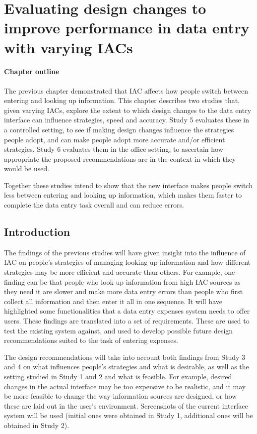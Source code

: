 \documentclass[11pt,oneside]{report}
\begin{document}
\begin{table}
\chapter{Evaluating design changes to improve performance in data entry with varying IACs}

\begin{mynote}
\subsubsection{Chapter outline}
The previous chapter demonstrated that IAC affects how people switch between entering and looking up information. This chapter describes two studies that, given varying IACs, explore the extent to which design changes to the data entry interface can influence strategies, speed and accuracy. Study 5 evaluates these in a controlled setting, to see if making design changes influence the strategies people adopt, and can make people adopt more accurate and/or efficient strategies. Study 6 evaluates them in the office setting, to ascertain how appropriate the proposed recommendations are in the context in which they would be used.

Together these studies intend to show that the new interface makes people switch less between entering and looking up information, which makes them faster to complete the data entry task overall and can reduce errors.
\end{mynote}

\section{Introduction}

The findings of the previous studies will have given insight into the influence of IAC on people's strategies of managing looking up information and how different strategies may be more efficient and accurate than others. For example, one finding can be that people who look up information from high IAC sources as they need it are slower and make more data entry errors than people who first collect all information and then enter it all in one sequence. 
It will have highlighted some functionalities that a data entry expenses system needs to offer users. These findings are translated into a set of requirements. These are used to test the existing system against, and used to develop possible future design recommendations suited to the task of entering expenses. 

The design recommendations will take into account both findings from Study 3 and 4 on what influences people's strategies and what is desirable, as well as the setting studied in Study 1 and 2 and what is feasible. For example, desired changes in the actual interface may be too expensive to be realistic, and it may be more feasible to change the way information sources are designed, or how these are laid out in the user's environment. Screenshots of the current interface system will be used (initial ones were obtained in Study 1, additional ones will be obtained in Study 2). 


\end{table}
\end{document}
